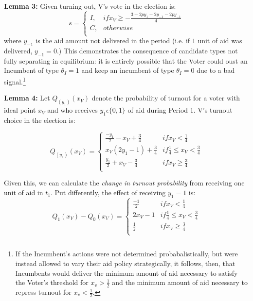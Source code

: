 \documentclass[12pt]{paper}
\begin{document}
\textbf{Lemma 3:}
Given turning out, V’s vote in the election is:
\begin{equation}
s =
\begin{cases}
I, & if x_V \geq -\frac{3 - 2py_1 - 2y_{-1} - 2py_{-1}}{4} \\    
C,     & otherwise  \\
\end{cases}
\end{equation}
where $y_{-1}$ is the aid amount not delivered in the period (i.e. if $1$ unit of aid was delivered, $y_{-1} = 0$.) This demonstrates the consequence of candidate types not fully separating in equilibrium: it is entirely possible that the Voter could oust an Incumbent of type $\theta_I = 1$ and keep an incumbent of type $\theta_I = 0$ due to a bad signal.\footnote{If the Incumbent's actions were not determined probabalistically, but were instead allowed to vary their aid policy strategically, it follows, then, that Incumbents would deliver the minimum amount of aid necessary to satisfy the Voter's threshold for $x_v > \frac{1}{2}$ and the minimum amount of aid necessary to repress turnout for $x_v < \frac{1}{2}$.}


\textbf{Lemma 4:} Let $Q_(y_1 )(x_V )$ denote the probability of turnout for a voter with ideal point $x_V$ and who receives $y_1 \epsilon \{0,1\}$ of aid during Period 1. V’s turnout choice in the election is:

\begin{equation}
Q_(y_1 )(x_V ) =
\begin{cases}
\frac{-y_1}{2} - x_V + \frac{3}{4} & if x_V < \frac{1}{4}\\    
x_V (2y_1 - 1) + \frac{3}{4}     & if \frac{1}{4} \leq x_V < \frac{3}{4}  \\
\frac{y_1}{2} + x_V - \frac{3}{4}     & if x_V \geq \frac{3}{4}  \\
\end{cases}
\end{equation}


Given this, we can calculate the \emph{change in turnout probability} from receiving one unit of aid in $t_1$. Put differently, the effect of receiving $y_1 = 1$ is:
\begin{equation}
Q_1 (x_V ) - Q_0 (x_V )=
\begin{cases}
\frac{-1}{2} & if x_V < \frac{1}{4}\\    
2x_V - 1 & if \frac{1}{4} \leq x_V < \frac{3}{4}  \\
\frac{1}{2} & if x_V \geq \frac{3}{4}  \\
\end{cases}
\end{equation}
\end{document}
